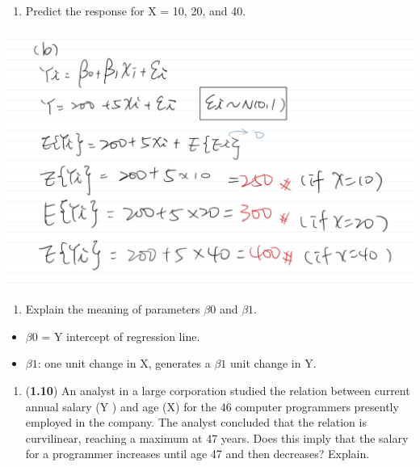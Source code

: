 \documentclass[
]{article}
\providecommand{\tightlist}{%
  \setlength{\itemsep}{0pt}\setlength{\parskip}{0pt}}
\begin{document}
\begin{enumerate}
\def\labelenumi{(\alph{enumi})}
\setcounter{enumi}{1}
\tightlist
\item
  Predict the response for X = 10, 20, and 40.\\
\end{enumerate}

\includegraphics{pics/IMG_BEAC2260AB98-1.jpeg}

\begin{enumerate}
\def\labelenumi{(\alph{enumi})}
\setcounter{enumi}{2}
\tightlist
\item
  Explain the meaning of parameters \(\beta0\) and \(\beta1\).\\
\end{enumerate}

\begin{itemize}
\tightlist
\item
  \(\beta0\) = Y intercept of regression line.
\item
  \(\beta1\): one unit change in X, generates a \(\beta1\) unit change
  in Y.
\end{itemize}

\begin{enumerate}
\def\labelenumi{\arabic{enumi}.}
\setcounter{enumi}{2}
\tightlist
\item
  (\textbf{1.10}) An analyst in a large corporation studied the relation
  between current annual salary (Y ) and age (X) for the 46 computer
  programmers presently employed in the company. The analyst concluded
  that the relation is curvilinear, reaching a maximum at 47 years. Does
  this imply that the salary for a programmer increases until age 47 and
  then decreases? Explain.
\end{enumerate}
\end{document}
